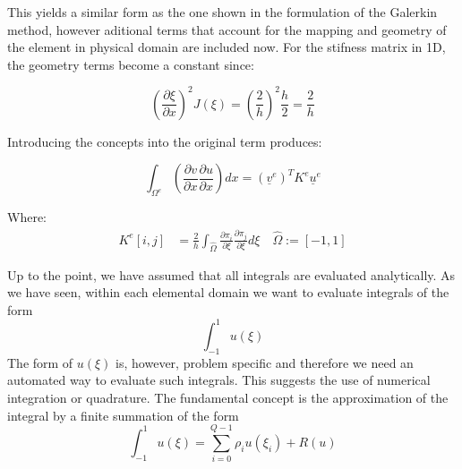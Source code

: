 \documentclass[
  a4paper,
  10pt]{article}
\begin{document}
This yields a similar form as the one shown in the formulation of the
Galerkin method, however aditional terms that account for the mapping
and geometry of the element in physical domain are included now. For the
stifness matrix in 1D, the geometry terms become a constant since:

\begin{equation}
(\frac{\partial \xi}{\partial x})^{2} J(\xi)= (\frac{2}{h})^{2}\frac{h}{2}=\frac{2}{h} 
\end{equation}

Introducing the concepts into the original term produces:

\begin{equation}
\int_{\Omega^{e}} ( \frac{\partial v}{\partial x}\frac{\partial u}{\partial x})dx =(\underline{v}^{e})^{T}K^{e}\underline{u}^{e}
\end{equation}

Where: \begin{align}
K^{e}[i,j]&=\frac{2}{h}\int_{\hat{\Omega}}\frac{\partial \pi_{i}}{\partial\xi}\frac{\partial \pi_{j}}{\partial\xi} d\xi \quad \hat{\Omega} := [-1,1] 
\end{align}

Up to the point, we have assumed that all integrals are evaluated
analytically. As we have seen, within each elemental domain we want to
evaluate integrals of the form \begin{equation}
\int_{-1}^{1}u(\xi)
\end{equation} The form of \(u(\xi)\) is, however, problem specific and
therefore we need an automated way to evaluate such integrals. This
suggests the use of numerical integration or quadrature. The fundamental
concept is the approximation of the integral by a finite summation of
the form \begin{equation}
\int_{-1}^{1}u(\xi) = \sum_{i=0}^{Q-1}\rho_iu(\xi_i)+R(u)
\end{equation}
\end{document}
